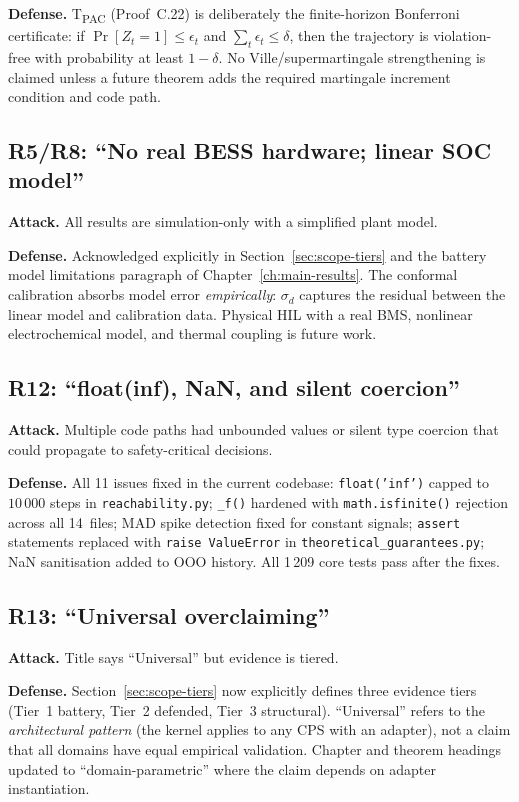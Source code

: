 \textbf{Defense.}  T\textsubscript{PAC} (Proof~C.22) is deliberately the
finite-horizon Bonferroni certificate: if
\(\Pr[Z_t=1]\le\epsilon_t\) and \(\sum_t\epsilon_t\le\delta\), then the
trajectory is violation-free with probability at least \(1-\delta\).  No
Ville/supermartingale strengthening is claimed unless a future theorem adds
the required martingale increment condition and code path.

\subsection{R5/R8: ``No real BESS hardware; linear SOC model''}
\textbf{Attack.}  All results are simulation-only with a simplified
plant model.

\textbf{Defense.}  Acknowledged explicitly in Section~\ref{sec:scope-tiers}
and the battery model limitations paragraph of
Chapter~\ref{ch:main-results}.  The conformal calibration absorbs model
error \emph{empirically}: $\sigma_d$ captures the residual between the
linear model and calibration data.  Physical HIL with a real BMS,
nonlinear electrochemical model, and thermal coupling is future work.

\subsection{R12: ``float(inf), NaN, and silent coercion''}
\textbf{Attack.}  Multiple code paths had unbounded values or silent
type coercion that could propagate to safety-critical decisions.

\textbf{Defense.}  All 11 issues fixed in the current codebase:
\texttt{float('inf')} capped to $10\,000$ steps in \texttt{reachability.py};
\texttt{\_f()} hardened with \texttt{math.isfinite()} rejection across all
14~files; MAD spike detection fixed for constant signals; \texttt{assert}
statements replaced with \texttt{raise ValueError} in
\texttt{theoretical\_guarantees.py}; NaN sanitisation added to OOO history.
All 1\,209 core tests pass after the fixes.

\subsection{R13: ``Universal overclaiming''}
\textbf{Attack.}  Title says ``Universal'' but evidence is
tiered.

\textbf{Defense.}  Section~\ref{sec:scope-tiers} now explicitly defines
three evidence tiers (Tier~1 battery, Tier~2 defended, Tier~3 structural).
``Universal'' refers to the \emph{architectural pattern} (the kernel
applies to any CPS with an adapter), not a claim that all domains have
equal empirical validation.  Chapter and theorem headings updated to
``domain-parametric'' where the claim depends on adapter instantiation.

